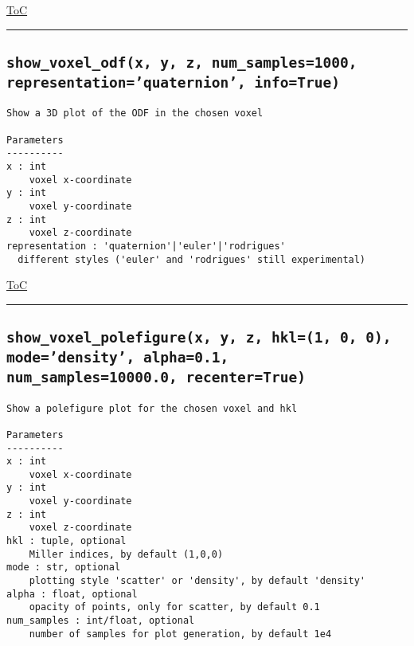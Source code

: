 \documentclass{article}
\begin{document}
\begin{flushright}

\hyperref[toc]{ToC}

\end{flushright}



\vspace{5mm}

\hrule

\subsection*{\texttt{show\_voxel\_odf(x, y, z, num\_samples=1000, representation='quaternion', info=True)}}
\label{fun:showvoxelodf}

\begin{lstlisting}[language=docstring]
Show a 3D plot of the ODF in the chosen voxel

Parameters
----------
x : int
    voxel x-coordinate
y : int
    voxel y-coordinate
z : int
    voxel z-coordinate
representation : 'quaternion'|'euler'|'rodrigues'
  different styles ('euler' and 'rodrigues' still experimental)
\end{lstlisting}

\begin{flushright}

\hyperref[toc]{ToC}

\end{flushright}



\vspace{5mm}

\hrule

\subsection*{\texttt{show\_voxel\_polefigure(x, y, z, hkl=(1, 0, 0), mode='density', alpha=0.1, num\_samples=10000.0, recenter=True)}}
\label{fun:showvoxelpolefigure}

\begin{lstlisting}[language=docstring]
Show a polefigure plot for the chosen voxel and hkl

Parameters
----------
x : int
    voxel x-coordinate
y : int
    voxel y-coordinate
z : int
    voxel z-coordinate
hkl : tuple, optional
    Miller indices, by default (1,0,0)
mode : str, optional
    plotting style 'scatter' or 'density', by default 'density'
alpha : float, optional
    opacity of points, only for scatter, by default 0.1
num_samples : int/float, optional
    number of samples for plot generation, by default 1e4
\end{lstlisting}
\end{document}
